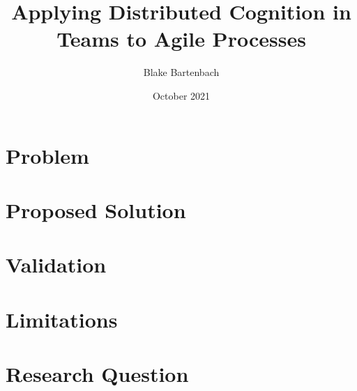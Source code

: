 \documentclass[acmsmall,screen,authorversion]{acmart}
\begin{document}
\title{Applying Distributed Cognition in Teams to Agile Processes}

\author{Blake Bartenbach}
\date{October 2021}

\usepackage{natbib}
\usepackage{graphicx}


\maketitle

\section{Problem}

\section{Proposed Solution}

\section{Validation}

\section{Limitations}

\section{Research Question}



\end{document}
